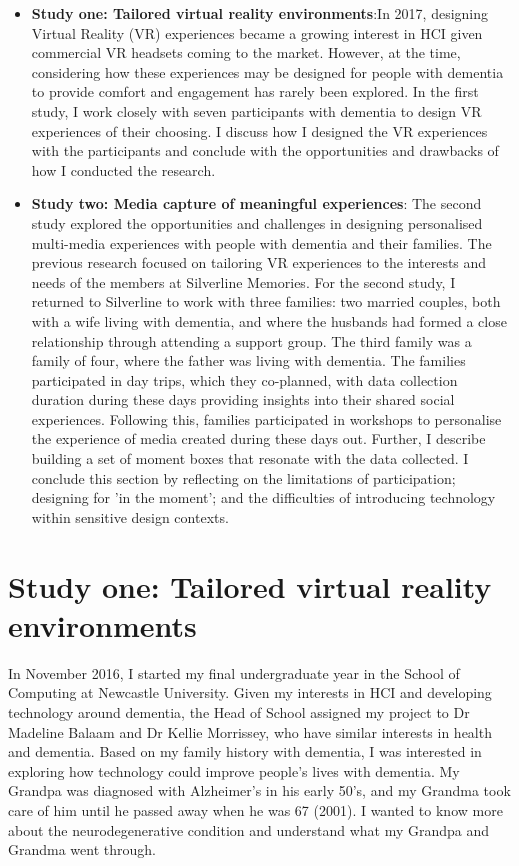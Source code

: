 \begin{itemize}
    \item  \textbf{Study one: Tailored virtual reality environments}:In 2017, designing Virtual Reality (VR) experiences became a growing interest in HCI given commercial VR headsets coming to the market. However, at the time, considering how these experiences may be designed for people with dementia to provide comfort and engagement has rarely been explored. In the first study, I work closely with seven participants with dementia to design VR experiences of their choosing. I discuss how I designed the VR experiences with the participants and conclude with the opportunities and drawbacks of how I conducted the research.

    \item \textbf{Study two: Media capture of meaningful experiences}: The second study explored the opportunities and challenges in designing personalised multi-media experiences with people with dementia and their families. The previous research focused on tailoring VR experiences to the interests and needs of the members at Silverline Memories. For the second study, I returned to Silverline to work with three families: two married couples, both with a wife living with dementia, and where the husbands had formed a close relationship through attending a support group. The third family was a family of four, where the father was living with dementia. The families participated in day trips, which they co-planned, with data collection duration during these days providing insights into their shared social experiences. Following this, families participated in workshops to personalise the experience of media created during these days out. Further, I describe building a set of moment boxes that resonate with the data collected. I conclude this section by reflecting on the limitations of participation; designing for 'in the moment'; and the difficulties of introducing technology within sensitive design contexts.
\end{itemize}

\section{Study one: Tailored virtual reality environments}
\label{StudyOne}
In November 2016, I started my final undergraduate year in the School of Computing at Newcastle University. Given my interests in  HCI and developing technology around dementia, the Head of School assigned my project to Dr Madeline Balaam and Dr Kellie Morrissey, who have similar interests in health and dementia. Based on my family history with dementia, I was interested in exploring how technology could improve people's lives with dementia. My Grandpa was diagnosed with Alzheimer’s in his early 50’s, and my Grandma took care of him until he passed away when he was 67 (2001). I wanted to know more about the neurodegenerative condition and understand what my Grandpa and Grandma went through. 

